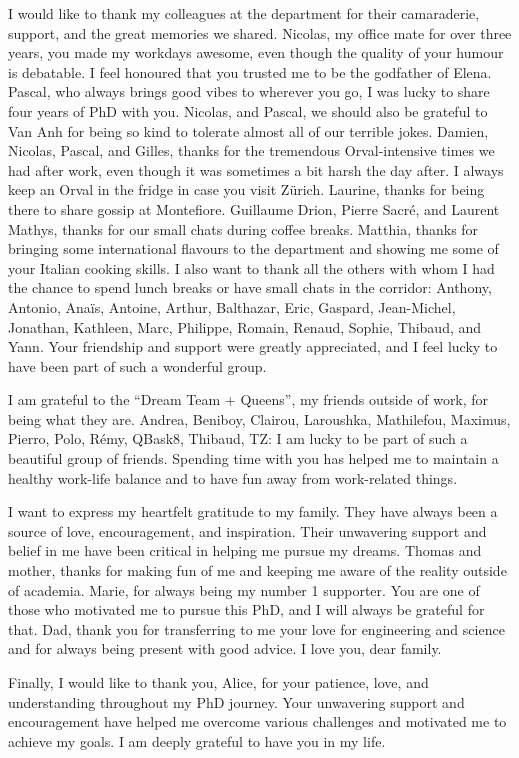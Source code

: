 I would like to thank my colleagues at the department for their camaraderie, support, and the great memories we shared. Nicolas, my office mate for over three years, you made my workdays awesome, even though the quality of your humour is debatable. I feel honoured that you trusted me to be the godfather of Elena. Pascal, who always brings good vibes to wherever you go, I was lucky to share four years of PhD with you. Nicolas, and Pascal, we should also be grateful to Van Anh for being so kind to tolerate almost all of our terrible jokes. Damien, Nicolas, Pascal, and Gilles, thanks for the tremendous Orval-intensive times we had after work, even though it was sometimes a bit harsh the day after. I always keep an Orval in the fridge in case you visit Z{\"u}rich. Laurine, thanks for being there to share gossip at Montefiore. Guillaume Drion, Pierre Sacr{\'e}, and Laurent Mathys, thanks for our small chats during coffee breaks. Matthia, thanks for bringing some international flavours to the department and showing me some of your Italian cooking skills. I also want to thank all the others with whom I had the chance to spend lunch breaks or have small chats in the corridor: Anthony, Antonio, Ana{\"i}s, Antoine, Arthur, Balthazar, Eric, Gaspard, Jean-Michel, Jonathan, Kathleen, Marc, Philippe, Romain, Renaud, Sophie, Thibaud, and Yann. Your friendship and support were greatly appreciated, and I feel lucky to have been part of such a wonderful group.

I am grateful to the ``Dream Team + Queens'', my friends outside of work, for being what they are. Andrea, Beniboy, Clairou, Laroushka, Mathilefou, Maximus, Pierro, Polo, R{\'e}my, QBask8, Thibaud, TZ: I am lucky to be part of such a beautiful group of friends. Spending time with you has helped me to maintain a healthy work-life balance and to have fun away from work-related things.

I want to express my heartfelt gratitude to my family. They have always been a source of love, encouragement, and inspiration. Their unwavering support and belief in me have been critical in helping me pursue my dreams. Thomas and mother, thanks for making fun of me and keeping me aware of the reality outside of academia. Marie, for always being my number 1 supporter. You are one of those who motivated me to pursue this PhD, and I will always be grateful for that. Dad, thank you for transferring to me your love for engineering and science and for always being present with good advice. I love you, dear family.

Finally, I would like to thank you, Alice, for your patience, love, and understanding throughout my PhD journey. Your unwavering support and encouragement have helped me overcome various challenges and motivated me to achieve my goals. I am deeply grateful to have you in my life.
%
%
%
%
%
%
